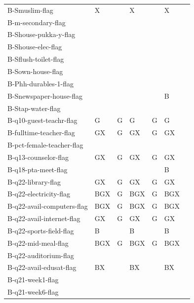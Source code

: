\begin{tabular}{@{\extracolsep{1pt}}p{7.8cm}*{6}{>{\centering\arraybackslash}m{2cm}}@{}}
B-Smuslim-flag & X &  & X &  & X \\ 
B-m-secondary-flag &  &  &  &  &  \\ 
B-Shouse-pukka-y-flag &  &  &  &  &  \\ 
B-Shouse-elec-flag &  &  &  &  &  \\ 
B-Sflush-toilet-flag &  &  &  &  &  \\ 
B-Sown-house-flag &  &  &  &  &  \\ 
B-Phh-durables-1-flag &  &  &  &  &  \\ 
B-Snewspaper-house-flag &  &  &  &  & B \\ 
B-Stap-water-flag &  &  &  &  &  \\ 
B-q10-guest-teachr-flag & G & G & G & G & G \\ 
B-fulltime-teacher-flag & GX & G & GX & G & GX \\ 
B-pct-female-teacher-flag &  &  &  &  &  \\ 
B-q13-counselor-flag & GX & G & GX & G & GX \\ 
B-q18-pta-meet-flag &  &  &  &  & B \\ 
B-q22-library-flag & GX & G & GX & G & GX \\ 
B-q22-electricity-flag & BGX & G & BGX & G & BGX \\ 
B-q22-avail-computers-flag & BGX & G & BGX & G & BGX \\ 
B-q22-avail-internet-flag & GX & G & GX & G & GX \\ 
B-q22-sports-field-flag & B &  & B &  & B \\ 
B-q22-mid-meal-flag & BGX & G & BGX & G & BGX \\ 
B-q22-auditorium-flag &  &  &  &  &  \\ 
B-q22-avail-edusat-flag & BX &  & BX &  & BX \\ 
B-q21-week1-flag &  &  &  &  &  \\ 
B-q21-week6-flag &  &  &  &  &  \\ 
\bottomrule
\end{tabular}
